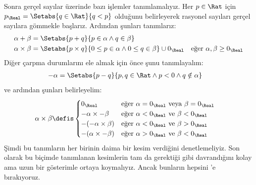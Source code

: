 Sonra gerçel sayılar üzerinde bazı işlemler tanımlamalıyız. Her $p \in \Rat$
için $p_\Real = \Setabs{q \in \Rat}{q < p}$ olduğunu belirleyerek rasyonel
sayıları gerçel sayılara gömmekle başlarız. Ardından şunları tanımlarız:
\begin{align*}
	\alpha + \beta &= \Setabs{p + q}{p \in \alpha \land q \in \beta}\\
	\alpha \times \beta &=
	\Setabs{p \times q}{0 \leq p \in \alpha \land 0 \leq q \in \beta} \cup 0_\Real & \text{eğer }\alpha, \beta \geq 0_\Real
\end{align*}
Diğer çarpma durumlarını ele almak için önce şunu tanımlayalım:
\begin{align*}
	-\alpha &= \Setabs{p - q}{p,q \in \Rat \land p < 0 \land q \notin \alpha}
\end{align*}
ve ardından şunları belirleyelim:
\begin{align*}
	\alpha \times \beta &\defis
	\begin{cases}
		0_\Real &\text{eğer }\alpha = 0_\Real\text{ veya }\beta = 0_\Real\\
		\mathord{-}\alpha \times \mathord{-}\beta &\text{eğer }\alpha < 0_\Real\text{ ve }\beta < 0_\Real\\
		\mathord{-}(\mathord{-}\alpha \times \beta) &\text{eğer }\alpha < 0_\Real \text{ ve }\beta > 0_\Real\\
		\mathord{-}(\alpha \times \mathord{-}\beta) &\text{eğer }\alpha > 0_\Real \text{ ve }\beta < 0_\Real
	\end{cases}
\end{align*}
Şimdi bu tanımların her birinin daima bir kesim verdiğini denetlemeliyiz. Son
olarak bu biçimde tanımlanan kesimlerin tam da gerektiği gibi davrandığını
kolay ama uzun bir gösterimle ortaya koymalıyız. Ancak bunların hepsini
'e bırakıyoruz.
